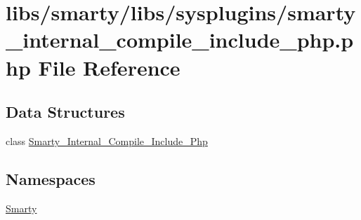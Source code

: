 \hypertarget{smarty__internal__compile__include__php_8php}{}\section{libs/smarty/libs/sysplugins/smarty\+\_\+internal\+\_\+compile\+\_\+include\+\_\+php.php File Reference}
\label{smarty__internal__compile__include__php_8php}
\subsection*{Data Structures}
\begin{DoxyCompactItemize}
\item 
class \hyperlink{class_smarty___internal___compile___include___php}{Smarty\+\_\+\+Internal\+\_\+\+Compile\+\_\+\+Include\+\_\+\+Php}
\end{DoxyCompactItemize}
\subsection*{Namespaces}
\begin{DoxyCompactItemize}
\item 
 \hyperlink{namespace_smarty}{Smarty}
\end{DoxyCompactItemize}
